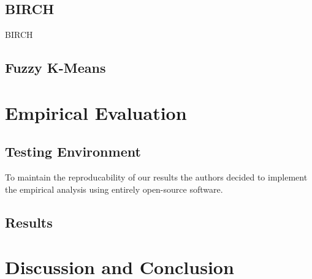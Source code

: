 \documentclass{article}
\begin{document}
\subsection{BIRCH}

\begin{algorithm}
\caption{BIRCH}
\begin{algorithmic}[1]
\EndProcedure
\end{algorithmic}
\end{algorithm}

\subsection{Fuzzy K-Means}

\section{Empirical Evaluation}

\subsection{Testing Environment}
To maintain the reproducability of our results the authors decided to implement the empirical analysis using entirely open-source software.  

\subsection{Results}

\section{Discussion and Conclusion}
\end{document}
